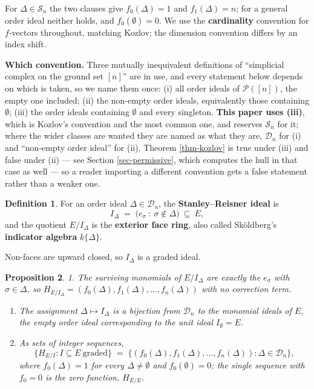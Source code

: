 \documentclass[11pt, a4paper, abstract=yes]{scrartcl}
\theoremstyle{definition}
\newtheorem{definition}{Definition}
\theoremstyle{remark}
\theoremstyle{plain}
\newtheorem{proposition}[definition]{Proposition}
\newcommand{\leannone}{\tikz[baseline=-0.6ex]\draw[leannone,line width=0.6pt] (0,0) circle (0.55ex);}
\newcommand{\leanmark}[1]{\leavevmode{\reversemarginpar\marginnote{\raggedleft#1}}}
\begin{document}
For \(\Delta\in\mathcal S_n\) the two clauses give \(f_0(\Delta)=1\) and \(f_1(\Delta)=n\); for a
general order ideal neither holds, and \(f_0(\emptyset)=0\). We use the \textbf{cardinality} convention for
\(f\)-vectors throughout, matching Kozlov; the dimension convention differs by an index shift.

\textbf{Which convention.} Three mutually inequivalent definitions of ``simplicial complex on the ground set
\([n]\)'' are in use, and every statement below depends on which is taken, so we name them once:
(i) all order ideals of \(\mathcal P([n])\), the empty one included; (ii) the non-empty order ideals,
equivalently those containing \(\emptyset\); (iii) the order ideals containing \(\emptyset\) and
every singleton. \textbf{This paper uses (iii)}, which is Kozlov's convention and the most common one, and
reserves \(\mathcal S_n\) for it; where the wider classes are wanted they are named as what they are,
\(\mathcal D_n\) for (i) and ``non-empty order ideal'' for (ii). Theorem \ref{thm-kozlov} is true under
(iii) and false under (ii) --- see Section \ref{sec-permissive}, which computes the hull in that case as
well --- so a reader importing a different convention gets a false statement rather than a weaker one.

\begin{definition}
For an order ideal \(\Delta\in\mathcal D_n\), the \textbf{Stanley--Reisner ideal} is
\begin{equation}\label{eq:sr-ideal}
  I_\Delta\;=\;\bigl(e_\sigma\ :\ \sigma\notin\Delta\bigr)\ \subseteq\ E,
\end{equation}
and the quotient \(E/I_\Delta\) is the \textbf{exterior face ring}, also called Sköldberg's \textbf{indicator
algebra} \(k\lbrace\Delta\rbrace\).
\label{def-sr-ideal}
\end{definition}

Non-faces are upward closed, so \(I_\Delta\) is a graded ideal.

\begin{proposition}
\leanmark{\leannone}1. The surviving monomials of \(E/I_\Delta\) are exactly the \(e_\sigma\) with \(\sigma\in\Delta\),
   so \(H_{E/I_\Delta}=(f_0(\Delta),f_1(\Delta),\dots,f_n(\Delta))\) with no correction term.
\begin{enumerate}
\item The assignment \(\Delta\mapsto I_\Delta\) is a bijection from \(\mathcal D_n\) to the monomial
ideals of \(E\), the empty order ideal corresponding to the unit ideal \(I_\emptyset=E\).
\item As sets of integer sequences,
\[
     \lbrace H_{E/I}: I\subseteq E\ \text{graded}\rbrace
     \;=\;\lbrace (f_0(\Delta),f_1(\Delta),\dots,f_n(\Delta)): \Delta\in\mathcal D_n\rbrace ,
   \]
where \(f_0(\Delta)=1\) for every \(\Delta\ne\emptyset\) and \(f_0(\emptyset)=0\); the single
sequence with \(f_0=0\) is the zero function, \(H_{E/E}\).
\end{enumerate}
\label{prop-dictionary}
\end{proposition}
\end{document}
